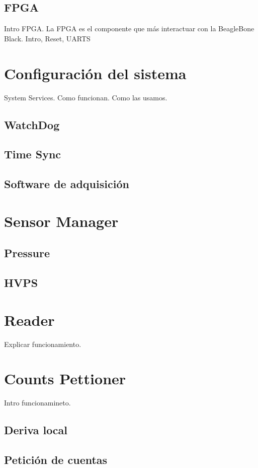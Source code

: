 	\subsection{FPGA}
		Intro FPGA. La FPGA es el componente que más interactuar con la BeagleBone Black.
		Intro, Reset, UARTS 

\section{Configuración del sistema}
	System Services. Como funcionan. Como las usamos.
	\subsection{WatchDog}
	\subsection{Time Sync}
	\subsection{Software de adquisición}

\section{Sensor Manager}
	\subsection{Pressure}
	\subsection{HVPS}

\section{Reader}
	Explicar funcionamiento.

\section{Counts Pettioner}
	Intro funcionamineto.
	\subsection{Deriva local}
	\subsection{Petición de cuentas}
